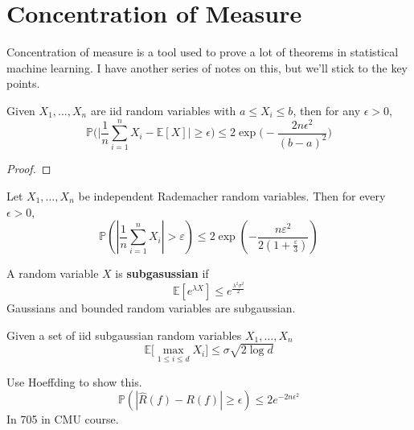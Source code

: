 \section{Concentration of Measure}

  Concentration of measure is a tool used to prove a lot of theorems in statistical machine learning. I have another series of notes on this, but we'll stick to the key points. 

  \begin{theorem}
    Given $X_1, \ldots, X_n$ are iid random variables with $a \leq X_i \leq b$, then for any $\epsilon > 0$, 
    \begin{equation}
      \mathbb{P} \bigg( \bigg| \frac{1}{n} \sum_{i=1}^n X_i - \mathbb{E}[X] \bigg| \geq \epsilon \bigg) \leq 2 \exp \bigg( - \frac{2 n \epsilon^2}{(b - a)^2} \bigg)
    \end{equation}
  \end{theorem}
  \begin{proof}
    
  \end{proof}

  \begin{theorem}
    Let $X_1, \ldots, X_n$ be independent Rademacher random variables. Then for every $\epsilon > 0$, 
    \begin{equation}
      \mathbb{P}\left(\left|\frac{1}{n}\sum_{i=1}^{n}X_i\right| > \varepsilon\right) \leq 2\exp\left(-\frac{n\varepsilon^2}{2(1+\frac{\varepsilon}{3})}\right)
    \end{equation} 
  \end{theorem}

  \begin{definition}
    A random variable $X$ is \textbf{subgasussian} if 
    \begin{equation}
      \mathbb{E}[e^{\lambda X}] \leq e^{\frac{\lambda^2 \sigma^2}{2}}
    \end{equation}
    Gaussians and bounded random variables are subgaussian.
  \end{definition}

  \begin{lemma}
    \label{subgaussian_bound}
    Given a set of iid subgaussian random variables $X_1, \ldots, X_n$ 
    \begin{equation}
      \mathbb{E}\big[ \max_{1 \leq i \leq d} X_i \big] \leq \sigma \sqrt{2 \log d}
    \end{equation}
  \end{lemma}


  Use Hoeffding to show this. 
  \begin{equation}
    \mathbb{P} (|\hat{R} (f) - R(f)| \geq \epsilon) \leq 2e^{- 2 n \epsilon^2}
  \end{equation}
  In 705 in CMU course. 

